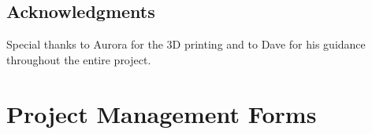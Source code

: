 \documentclass[12pt, a4paper]{report}
\begin{document}


\newpage
\section*{Acknowledgments}
Special thanks to Aurora for the 3D printing and to Dave for his guidance throughout the entire project.
\newpage

\singlespace




\newpage
\appendix
\appendixpage
\addappheadtotoc

\chapter{Project Management Forms}
\end{document}
